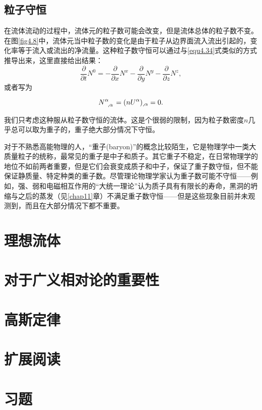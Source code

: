 \subsection*{粒子守恒}
在流体流动的过程中，流体元的粒子数可能会改变，但是流体总体的粒子数不变。在图\ref{fig4.8}中，流体元当中粒子数的变化是由于粒子从边界面流入流出引起的，变化率等于流入或流出的净流量。这种粒子数守恒可以通过与\eqref{equ4.34}式类似的方式推导出来，这里直接给出结果：
\[
    \frac{\partial}{\partial t} N^0 = -\frac{\partial}{\partial x} N^x - \frac{\partial}{\partial y} N^y - \frac{\partial}{\partial z} N^z,
\]
或者写为
\begin{shaded}
\begin{equation}
    N\indices{^\alpha_{, \alpha}}  = (n U^\alpha)_{, \alpha} = 0.
\label{equ4.35}
\end{equation}
\end{shaded}
我们只考虑这种服从粒子数守恒的流体。这是个很弱的限制，因为粒子数密度$n$几乎总可以取为重子的，重子绝大部分情况下守恒。

对于不熟悉高能物理的人，“重子(baryon)”的概念比较陌生，它是物理学中一类大质量粒子的统称，最常见的重子是中子和质子。其它重子不稳定，在日常物理学的地位不如前两者重要，但是它们会衰变成质子和中子，保证了重子数守恒，但不能保证静质量、特定种类的重子数。尽管理论物理学家认为重子数可能不守恒——例如，强、弱和电磁相互作用的“大统一理论”认为质子具有有限长的寿命，黑洞的坍缩与之后的蒸发（见\ref{chap11}章）不满足重子数守恒——但是这些现象目前并未观测到，而且在大部分情况下都不重要。


\section{理想流体}
\label{sec4.6}

\section{对于广义相对论的重要性}
\label{sec4.7}

\section{高斯定律}
\label{sec4.8}

\section{扩展阅读}
\label{sec4.9}

\section{习题}
\label{sec4.10}